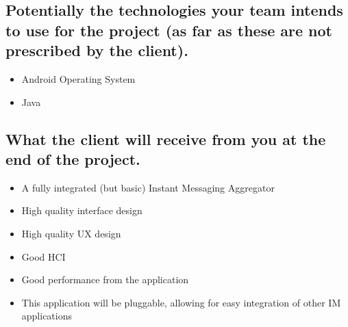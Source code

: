 \subsection{Potentially the technologies your team intends to use for the project (as far as these are not prescribed by the client).}
    \begin{itemize}
        \item Android Operating System
        \item Java
    \end{itemize}
\subsection{What the client will receive from you at the end of the project.}
    \begin{itemize}
        \item A fully integrated (but basic) Instant Messaging Aggregator
        \item High quality interface design
        \item High quality UX design
        \item Good HCI 
        \item Good performance from the application
        \item This application will be pluggable, allowing for easy integration of other IM applications

    \end{itemize}
